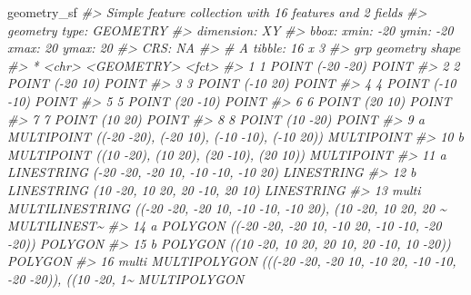 \documentclass[
]{report}
\newenvironment{Shaded}{\begin{snugshade}}{\end{snugshade}}
\newcommand{\CommentTok}[1]{\textcolor[rgb]{0.56,0.35,0.01}{\textit{#1}}}
\newcommand{\NormalTok}[1]{#1}
\begin{document}
\begin{Shaded}
\begin{Highlighting}[]
\NormalTok{geometry\_sf}
\CommentTok{\#\textgreater{} Simple feature collection with 16 features and 2 fields}
\CommentTok{\#\textgreater{} geometry type:  GEOMETRY}
\CommentTok{\#\textgreater{} dimension:      XY}
\CommentTok{\#\textgreater{} bbox:           xmin: {-}20 ymin: {-}20 xmax: 20 ymax: 20}
\CommentTok{\#\textgreater{} CRS:            NA}
\CommentTok{\#\textgreater{} \# A tibble: 16 x 3}
\CommentTok{\#\textgreater{}    grp                                                                    geometry shape       }
\CommentTok{\#\textgreater{}  * \textless{}chr\textgreater{}                                                                \textless{}GEOMETRY\textgreater{} \textless{}fct\textgreater{}       }
\CommentTok{\#\textgreater{}  1 1                                                               POINT ({-}20 {-}20) POINT       }
\CommentTok{\#\textgreater{}  2 2                                                                POINT ({-}20 10) POINT       }
\CommentTok{\#\textgreater{}  3 3                                                                POINT ({-}10 20) POINT       }
\CommentTok{\#\textgreater{}  4 4                                                               POINT ({-}10 {-}10) POINT       }
\CommentTok{\#\textgreater{}  5 5                                                                POINT (20 {-}10) POINT       }
\CommentTok{\#\textgreater{}  6 6                                                                 POINT (20 10) POINT       }
\CommentTok{\#\textgreater{}  7 7                                                                 POINT (10 20) POINT       }
\CommentTok{\#\textgreater{}  8 8                                                                POINT (10 {-}20) POINT       }
\CommentTok{\#\textgreater{}  9 a                         MULTIPOINT (({-}20 {-}20), ({-}20 10), ({-}10 {-}10), ({-}10 20)) MULTIPOINT  }
\CommentTok{\#\textgreater{} 10 b                             MULTIPOINT ((10 {-}20), (10 20), (20 {-}10), (20 10)) MULTIPOINT  }
\CommentTok{\#\textgreater{} 11 a                                 LINESTRING ({-}20 {-}20, {-}20 10, {-}10 {-}10, {-}10 20) LINESTRING  }
\CommentTok{\#\textgreater{} 12 b                                     LINESTRING (10 {-}20, 10 20, 20 {-}10, 20 10) LINESTRING  }
\CommentTok{\#\textgreater{} 13 multi MULTILINESTRING (({-}20 {-}20, {-}20 10, {-}10 {-}10, {-}10 20), (10 {-}20, 10 20, 20 \textasciitilde{} MULTILINEST\textasciitilde{}}
\CommentTok{\#\textgreater{} 14 a                         POLYGON (({-}20 {-}20, {-}20 10, {-}10 20, {-}10 {-}10, {-}20 {-}20)) POLYGON     }
\CommentTok{\#\textgreater{} 15 b                              POLYGON ((10 {-}20, 10 20, 20 10, 20 {-}10, 10 {-}20)) POLYGON     }
\CommentTok{\#\textgreater{} 16 multi MULTIPOLYGON ((({-}20 {-}20, {-}20 10, {-}10 20, {-}10 {-}10, {-}20 {-}20)), ((10 {-}20, 1\textasciitilde{} MULTIPOLYGON}
\end{Highlighting}
\end{Shaded}
\end{document}
